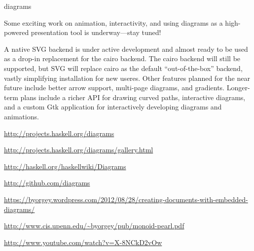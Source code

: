 \begin{hcarentry}[updated]{diagrams}
\FuturePlans

Some exciting work on animation, interactivity, and using diagrams as
a high-powered presentation tool is underway---stay tuned!

A native SVG backend is under active development and almost ready to
be used as a drop-in replacement for the cairo backend.  The cairo
backend will still be supported, but SVG will replace cairo as the
default ``out-of-the-box'' backend, vastly simplifying installation
for new useres. Other features planned for the near future include
better arrow support, multi-page diagrams, and gradients.  Longer-term
plans include a richer API for drawing curved paths, interactive
diagrams, and a custom Gtk application for interactively developing
diagrams and animations.

\FurtherReading
\begin{compactitem}
\item \url{http://projects.haskell.org/diagrams}
\item \url{http://projects.haskell.org/diagrams/gallery.html}
\item \url{http://haskell.org/haskellwiki/Diagrams}
\item \url{http://github.com/diagrams}
\item
  \url{https://byorgey.wordpress.com/2012/08/28/creating-documents-with-embedded-diagrams/}
\item \url{http://www.cis.upenn.edu/~byorgey/pub/monoid-pearl.pdf}
\item \url{http://www.youtube.com/watch?v=X-8NCkD2vOw}
\end{compactitem}
\end{hcarentry}
